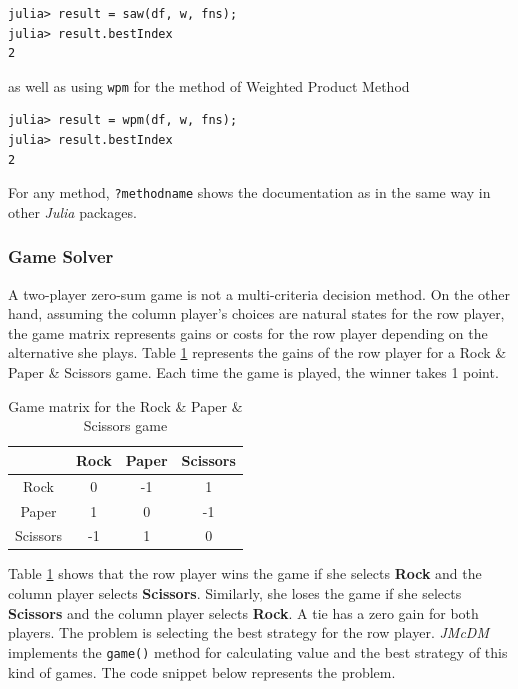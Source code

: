 \documentclass[preprint,review, 12pt, a4paper]{elsarticle}
\begin{document}
\begin{verbatim}
julia> result = saw(df, w, fns);
julia> result.bestIndex
2
\end{verbatim}

\noindent as well as using \texttt{wpm} for the method of Weighted Product Method

\begin{verbatim}
julia> result = wpm(df, w, fns);
julia> result.bestIndex
2
\end{verbatim}

\noindent For any method, \texttt{?methodname} shows the documentation as in the same way in other \emph{Julia} packages.

\subsubsection{Game Solver}

A two-player zero-sum game is not a multi-criteria decision method. On the other hand, assuming the column player's choices are natural states for the row player, the game matrix represents gains or costs for the 
row player depending on the alternative she plays. Table \ref{table:game_matrix} represents the gains of the row player for a Rock \& Paper \& Scissors game. Each time the game is played, the winner takes 1 point.  

\begin{table}[H]
	\centering
	\begin{tabular}{|c|c|c|c|}
		\hline
		\textbf{} & {Rock} &  {Paper} & {Scissors}\\
		\hline
		\hline
		{Rock} &  0 & -1 & 1 \\
		\hline
		{Paper} & 1 & 0 & -1 \\
		\hline
		{Scissors} & -1 & 1 & 0 \\
		\hline
	\end{tabular}
	\caption{Game matrix for the Rock \& Paper \& Scissors game}
	\label{table:game_matrix} 
\end{table}

\noindent Table \ref{table:game_matrix} shows that the row player wins the game if she selects \textbf{Rock} and the column player selects \textbf{Scissors}. Similarly, she loses the game if she selects
\textbf{Scissors} and the column player selects \textbf{Rock}. A tie has a zero gain for both players. The problem is selecting the best strategy for the row player. \emph{JMcDM} implements 
the \texttt{game()} method for calculating value and the best strategy of this kind of games. The code snippet below represents the problem.
\end{document}
